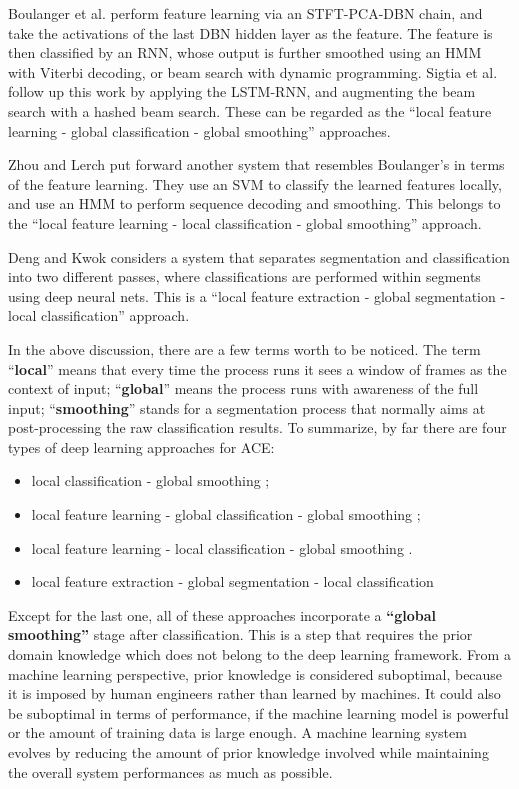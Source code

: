 Boulanger et al. \cite{boulanger2013audio} perform feature learning via an STFT-PCA-DBN chain, and take the activations of the last DBN hidden layer as the feature. The feature is then classified by an RNN, whose output is further smoothed using an HMM with Viterbi decoding, or beam search with dynamic programming. Sigtia et al. \cite{sigtia2015audio} follow up this work by applying the LSTM-RNN, and augmenting the beam search with a hashed beam search. These can be regarded as the ``local feature learning - global classification - global smoothing'' approaches.

Zhou and Lerch \cite{zhou2015chord} put forward another system that resembles Boulanger's in terms of the feature learning. They use an SVM to classify the learned features locally, and use an HMM to perform sequence decoding and smoothing. This belongs to the ``local feature learning - local classification - global smoothing'' approach.

Deng and Kwok \cite{deng2016hybrid} considers a system that separates segmentation and classification into two different passes, where classifications are performed within segments using deep neural nets. This is a ``local feature extraction - global segmentation - local classification'' approach.

In the above discussion, there are a few terms worth to be noticed. The term ``\textbf{local}'' means that every time the process runs it sees a window of frames as the context of input; ``\textbf{global}'' means the process runs with awareness of the full input; ``\textbf{smoothing}'' stands for a segmentation process that normally aims at post-processing the raw classification results. To summarize, by far there are four types of deep learning approaches for ACE:
\begin{itemize}
	\item local classification - global smoothing \cite{humphrey2012rethinking};
	\item local feature learning \cite{Korzeniowski2016feature} - global classification - global smoothing \cite{boulanger2013audio,sigtia2015audio};
	\item local feature learning - local classification - global smoothing \cite{zhou2015chord}.
	\item local feature extraction - global segmentation - local classification \cite{deng2016hybrid}
\end{itemize}
Except for the last one, all of these approaches incorporate a \textbf{``global smoothing''} stage after classification. This is a step that requires the prior domain knowledge which does not belong to the deep learning framework. From a machine learning perspective, prior knowledge is considered suboptimal, because it is imposed by human engineers rather than learned by machines. It could also be suboptimal in terms of performance, if the machine learning model is powerful or the amount of training data is large enough. A machine learning system evolves by reducing the amount of prior knowledge involved while maintaining the overall system performances as much as possible.

